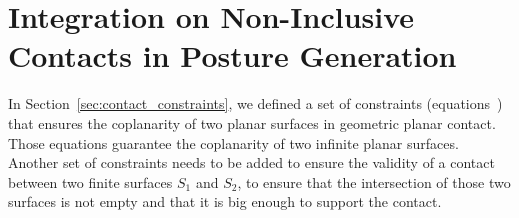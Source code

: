 \section{Integration on Non-Inclusive Contacts in Posture Generation}
\label{sec:integration_on_non_inclusive_contacts_in_posture generation}


In Section~\ref{sec:contact_constraints}, we defined a set of constraints (equations~) that ensures the coplanarity of two planar surfaces in geometric planar contact.
Those equations guarantee the coplanarity of two infinite planar surfaces.
Another set of constraints needs to be added to ensure the validity of a contact between two finite surfaces $S_1$ and $S_2$, to ensure that the intersection of those two surfaces is not empty and that it is big enough to support the contact.

